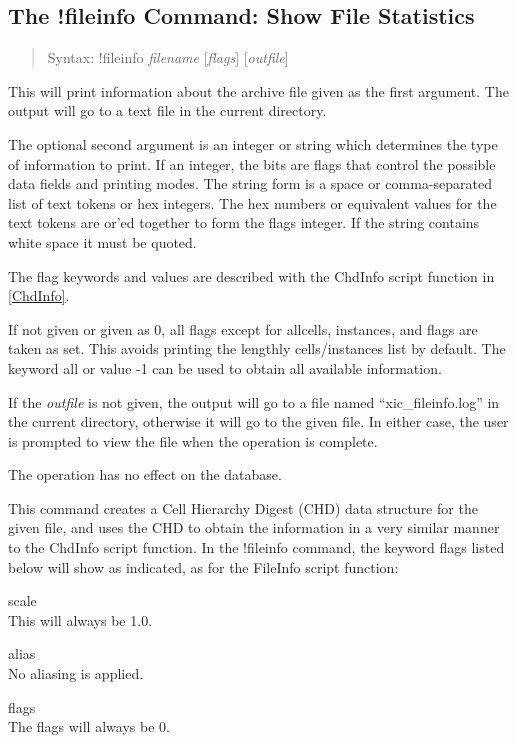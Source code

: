 \subsection{The {\cb !fileinfo} Command: Show File Statistics}
\label{fileinfo}
\begin{quote}
Syntax: {\vt !fileinfo} {\it filename} [{\it flags\/}] [{\it outfile\/}]
\end{quote}
This will print information about the archive file given as the first
argument.  The output will go to a text file in the current directory.

The optional second argument is an integer or string which determines
the type of information to print.  If an integer, the bits are flags
that control the possible data fields and printing modes.  The string
form is a space or comma-separated list of text tokens or hex
integers.  The hex numbers or equivalent values for the text tokens
are or'ed together to form the flags integer.  If the string contains
white space it must be quoted.

The flag keywords and values are described with the {\vt ChdInfo}
script function in \ref{ChdInfo}.

If not given or given as 0, all flags except for {\vt allcells}, {\vt
instances}, and {\vt flags} are taken as set.  This avoids printing
the lengthly cells/instances list by default.  The keyword {\vt all}
or value -1 can be used to obtain all available information.

If the {\it outfile} is not given, the output will go to a file named
``{\vt xic\_fileinfo.log}'' in the current directory, otherwise it
will go to the given file.  In either case, the user is prompted to
view the file when the operation is complete.

The operation has no effect on the database.

This command creates a Cell Hierarchy Digest (CHD) data structure for
the given file, and uses the CHD to obtain the information in a very
similar manner to the {\vt ChdInfo} script function.  In the {\cb
!fileinfo} command, the keyword flags listed below will show as
indicated, as for the {\vt FileInfo} script function:

\begin{description}
\item{\vt scale}\\
This will always be 1.0.
\item{\vt alias}\\
No aliasing is applied.
\item{\vt flags}\\
The flags will always be 0.
\end{description}

